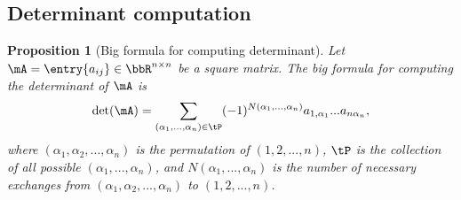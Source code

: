 \documentclass[11pt]{article}
\theoremstyle{plain}
\newtheorem{prop}{Proposition}
\theoremstyle{definition}
\begin{document}
\subsection{Determinant computation}
\begin{prop}[Big formula for computing determinant]
	Let  $\mA = \entry{a_{ij}} \in \bbR^{n \times n}$ be a square matrix. The big formula for computing the determinant of $\mA$ is
	\[ \det(\mA) =  \sum_{(\alpha_1,...,\alpha_n) \in \tP} (-1)^{N(\alpha_1,...,\alpha_n)} a_{1,\alpha_1} ... a_{n \alpha_n},  \]
	where $(\alpha_1, \alpha_2, ...,\alpha_n)$ is the permutation of $(1,2,...,n)$, $\tP$ is the collection of all possible  $(\alpha_1,...,\alpha_n)$, and $N(\alpha_1,...,\alpha_n)$ is the number of necessary exchanges from $(\alpha_1,\alpha_2,...,\alpha_n)$  to $(1,2,...,n)$. 
\end{prop}
\end{document}
